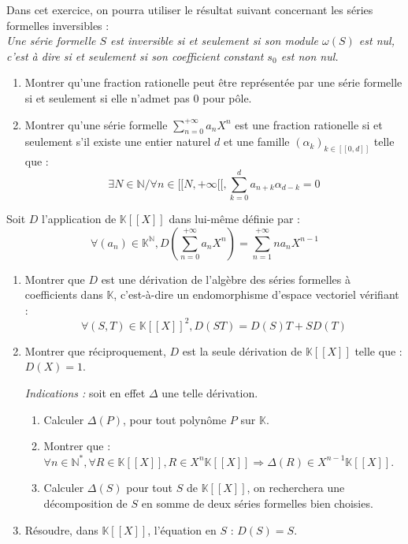 \begin{exer}
Dans cet exercice, on pourra utiliser le résultat suivant concernant les séries formelles inversibles :\\
\textit{Une s\'erie formelle $S$ est inversible si et seulement si son module $\omega (S)$ est nul, %
c'est \`a dire si et seulement si son coefficient constant $s_0$ est non nul.}
\begin{enumerate}
\item Montrer qu'une fraction rationelle peut être représentée par une série formelle si et seulement si %
elle n'admet pas $0$ pour pôle.
\item Montrer qu'une série formelle $\sum\limits_{n=0}^{+ \infty} a_n X^n$ est une fraction rationelle %
si et seulement s'il existe une entier naturel $d$ et une famille $(\alpha_k)_{k \in [\![0,d]\!]}$ telle que :
\[\exists N \in \mathbb{N} / \forall n \in [\![N,+\infty [\![ , \sum\limits_{k=0}^{d} a_{n+k} \alpha_{d-k} = 0\]
\end{enumerate}
\end{exer}

\begin{exer}
Soit $D$ l'application de $\mathbb{K}[[X]]$ dans lui-même définie par :
\[\forall (a_n) \in \mathbb{K}^{\mathbb{N}} , D\left(\sum\limits_{n=0}^{+ \infty} a_n X^n\right) = %
\sum\limits_{n=1}^{+ \infty} n a_n X^{n-1}\]
\begin{enumerate}
\item Montrer que $D$ est une dérivation de l'algèbre des séries formelles à coefficients dans $\mathbb{K}$, %
c'est-à-dire un endomorphisme d'espace vectoriel vérifiant :\[\forall (S,T) \in \mathbb{K}[[X]]^2 , D(ST) = D(S)T + SD(T)\]
\item Montrer que réciproquement, $D$ est la seule dérivation de $\mathbb{K}[[X]]$ telle que : $D(X)=1$.

\textit{Indications :} soit en effet $\Delta$ une telle d\'erivation.
\begin{enumerate}
\item Calculer $\Delta (P)$, pour tout polyn\^ome $P$ sur $\mathbb{K}$.
\item Montrer que : $\forall n \in \mathbb{N}^{\ast},\forall R\in \mathbb{K}[[X]], %
R\in X^n\mathbb{K}[[X]]\Rightarrow \Delta (R)\in X^{n-1}\mathbb{K}[[X]]$.
\item Calculer $\Delta (S)$ pour tout $S$ de $\mathbb{K}[[X]]$, %
on recherchera une d\'ecomposition de $S$ en somme de deux s\'eries formelles bien choisies.
\end{enumerate}
\item R\'esoudre, dans $\mathbb{K}[[X]]$, l'\'equation en $S$ : $D(S)=S$.
\end{enumerate}
\end{exer}
